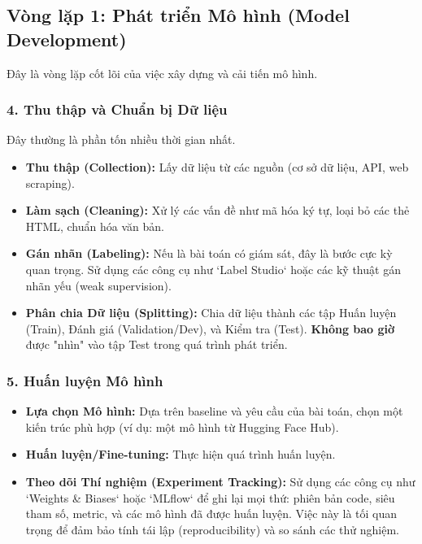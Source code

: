\subsection{Vòng lặp 1: Phát triển Mô hình (Model Development)}
\label{ssec:workflow_step1}
Đây là vòng lặp cốt lõi của việc xây dựng và cải tiến mô hình.

\subsubsection{4. Thu thập và Chuẩn bị Dữ liệu}
Đây thường là phần tốn nhiều thời gian nhất.
\begin{itemize}
    \item \textbf{Thu thập (Collection):} Lấy dữ liệu từ các nguồn (cơ sở dữ liệu, API, web scraping).
    \item \textbf{Làm sạch (Cleaning):} Xử lý các vấn đề như mã hóa ký tự, loại bỏ các thẻ HTML, chuẩn hóa văn bản.
    \item \textbf{Gán nhãn (Labeling):} Nếu là bài toán có giám sát, đây là bước cực kỳ quan trọng. Sử dụng các công cụ như `Label Studio` hoặc các kỹ thuật gán nhãn yếu (weak supervision).
    \item \textbf{Phân chia Dữ liệu (Splitting):} Chia dữ liệu thành các tập Huấn luyện (Train), Đánh giá (Validation/Dev), và Kiểm tra (Test). \textbf{Không bao giờ} được "nhìn" vào tập Test trong quá trình phát triển.
\end{itemize}

\subsubsection{5. Huấn luyện Mô hình}
\begin{itemize}
    \item \textbf{Lựa chọn Mô hình:} Dựa trên baseline và yêu cầu của bài toán, chọn một kiến trúc phù hợp (ví dụ: một mô hình từ Hugging Face Hub).
    \item \textbf{Huấn luyện/Fine-tuning:} Thực hiện quá trình huấn luyện.
    \item \textbf{Theo dõi Thí nghiệm (Experiment Tracking):} Sử dụng các công cụ như `Weights \& Biases` hoặc `MLflow` để ghi lại mọi thứ: phiên bản code, siêu tham số, metric, và các mô hình đã được huấn luyện. Việc này là tối quan trọng để đảm bảo tính tái lập (reproducibility) và so sánh các thử nghiệm.
\end{itemize}

